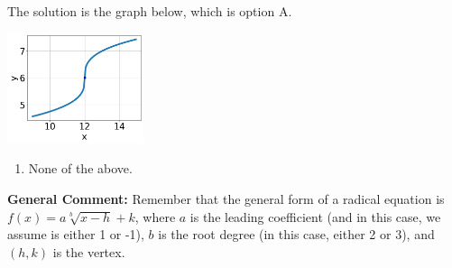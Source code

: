 \documentclass{extbook}[14pt]
\begin{document}
\begin{enumerate}
{The solution is the graph below, which is option A.
\begin{center}
    \includegraphics[width=0.3\textwidth]{../Figures/radicalEquationToGraphCopyAB.png}
\end{center}\begin{enumerate}[label=\Alph*.]
\item None of the above.\end{enumerate}
\textbf{General Comment:} Remember that the general form of a radical equation is $ f(x) = a \sqrt[b]{x - h} + k $, where $a$ is the leading coefficient (and in this case, we assume is either 1 or -1), $b$ is the root degree (in this case, either 2 or 3), and $(h, k)$ is the vertex.
}
\end{enumerate}
\end{document}
